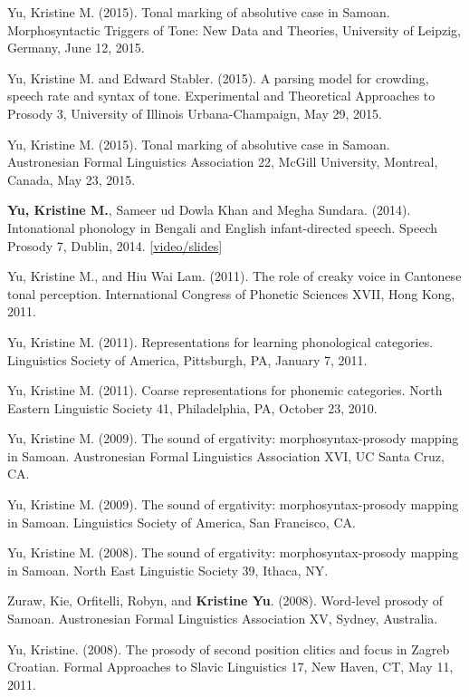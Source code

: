 \documentclass[10pt]{article}
\begin{document}
\begin{bibenum}
  \item Yu, Kristine M. (2015). Tonal marking of absolutive case in
    Samoan. Morphosyntactic Triggers of Tone:
New Data and Theories, University of Leipzig, Germany, June 12, 2015.  

  \item Yu, Kristine M. and Edward Stabler. (2015). A parsing model for crowding, speech rate and syntax of tone. Experimental and Theoretical Approaches to Prosody 3,
    University of Illinois Urbana-Champaign, May 29, 2015.

  \item Yu, Kristine M. (2015). Tonal marking of absolutive case in
    Samoan. Austronesian Formal Linguistics Association 22, McGill
    University, Montreal, Canada, May 23, 2015.  

\item \textbf{Yu, Kristine M.}, Sameer ud Dowla Khan and Megha
  Sundara. (2014). Intonational phonology in Bengali and English
  infant-directed speech. Speech Prosody 7, Dublin, 2014. [\href{https://www.superlectures.com/speechprosody2014/intonational-phonology-in-bengali-and-english-infant-directed-speech}{video/slides}]
  \item Yu, Kristine M., and Hiu Wai Lam. (2011). The role of creaky voice in Cantonese
    tonal perception. International Congress of Phonetic Sciences XVII, Hong Kong, 2011.

  \item Yu, Kristine M. (2011). Representations for learning
    phonological categories. Linguistics Society of America,
    Pittsburgh, PA, January 7, 2011.  

  \item Yu, Kristine M. (2011). Coarse representations for phonemic
    categories. North Eastern Linguistic Society 41, Philadelphia, PA,
    October 23, 2010. 

  \item Yu, Kristine M. (2009). The sound of ergativity: morphosyntax-prosody mapping in
    Samoan. Austronesian Formal Linguistics Association XVI, UC Santa Cruz, CA.

  \item Yu, Kristine M. (2009). The sound of ergativity: morphosyntax-prosody mapping in
    Samoan. Linguistics Society of America, San Francisco, CA.

  \item Yu, Kristine M. (2008). The sound of ergativity: morphosyntax-prosody mapping in
    Samoan. North East Linguistic Society 39, Ithaca, NY. 

  \item Zuraw, Kie, Orfitelli, Robyn, and \textbf{Kristine
    Yu}. (2008). Word-level prosody of Samoan. Austronesian Formal
    Linguistics Association XV, Sydney, Australia.  

  \item Yu, Kristine. (2008). The prosody of second position clitics
    and focus in Zagreb Croatian. Formal Approaches to Slavic
    Linguistics 17, New Haven, CT, May 11, 2011. 

\end{bibenum}
\end{document}
